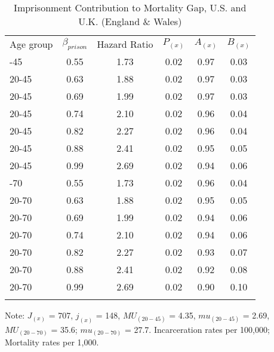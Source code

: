 \begin{table}[htp]
\centering
\scriptsize
\caption{Imprisonment Contribution to Mortality Gap, U.S. and U.K. (England \& Wales)}
\setlength{\tabcolsep}{10pt}

\label{gap}
\begin{threeparttable}
\begin{tabular}{lccccc}
  \hline
  \addlinespace
Age group & $\beta_{prison}$ & Hazard Ratio & $P_{(x)}$ & $A_{(x)}$ & $B_{(x)}$ \\
  \addlinespace
  \hline
  \addlinespace
  20-45 & 0.55 & 1.73 & 0.02 & 0.97 & 0.03 \\
  20-45 & 0.63 & 1.88 & 0.02 & 0.97 & 0.03 \\
  20-45 & 0.69 & 1.99 & 0.02 & 0.97 & 0.03 \\
  20-45 & 0.74 & 2.10 & 0.02 & 0.96 & 0.04 \\
  20-45 & 0.82 & 2.27 & 0.02 & 0.96 & 0.04 \\
  20-45 & 0.88 & 2.41 & 0.02 & 0.95 & 0.05 \\
  20-45 & 0.99 & 2.69 & 0.02 & 0.94 & 0.06 \\

\addlinespace[10pt]
  20-70 & 0.55 & 1.73 & 0.02 & 0.96 & 0.04 \\
  20-70 & 0.63 & 1.88 & 0.02 & 0.95 & 0.05 \\
  20-70 & 0.69 & 1.99 & 0.02 & 0.94 & 0.06 \\
  20-70 & 0.74 & 2.10 & 0.02 & 0.94 & 0.06 \\
  20-70 & 0.82 & 2.27 & 0.02 & 0.93 & 0.07 \\
  20-70 & 0.88 & 2.41 & 0.02 & 0.92 & 0.08 \\
  20-70 & 0.99 & 2.69 & 0.02 & 0.90 & 0.10 \\
  \addlinespace
   \hline
\end{tabular}
   \begin{tablenotes}
      \scriptsize
       \item Note: $J_{(x)}$ = 707, $j_{(x)}$ = 148, $MU_{(20-45)}$ = 4.35,  $mu_{(20-45)}$ = 2.69, $MU_{(20-70)}$ = 35.6;  $mu_{(20-70)}$ = 27.7. Incarceration rates per 100,000; Mortality rates per 1,000.
    \end{tablenotes}
\end{threeparttable}
\end{table}